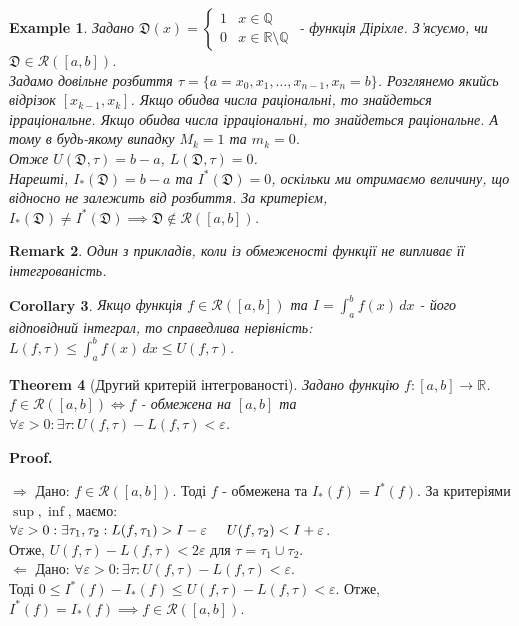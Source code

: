 \documentclass[a4paper, 10pt]{article}
\makeatletter
\def\huge{\displaystyle}
\def\qed{$\blacksquare$}
\def\rightproof{$\boxed{\Rightarrow}$ }
\def\leftproof{$\boxed{\Leftarrow}$ }
\theoremstyle{theoremdd}
\newtheorem{theorem}{Theorem}[subsection]
\theoremstyle{theoremdd}
\theoremstyle{theoremdd}
\theoremstyle{theoremdd}
\theoremstyle{theoremdd}
\newtheorem{example}[theorem]{Example}
\theoremstyle{theoremdd}
\theoremstyle{theoremdd}
\newtheorem{remark}[theorem]{Remark}
\theoremstyle{theoremdd}
\theoremstyle{theoremdd}
\newtheorem{corollary}[theorem]{Corollary}
\renewenvironment{proof}[1][Proof.\\]{\par
\pushQED{\hfill \qed}%
\normalfont \topsep6\p@\@plus6\p@\relax
\trivlist
\item\relax
{\bfseries
#1\@addpunct{.}}\hspace\labelsep\ignorespaces
}{%
\popQED\endtrivlist\@endpefalse
}
\makeatother
\begin{document}
\begin{example}
Задано $\mathfrak{D}(x) = \begin{cases} 1 & x \in \mathbb{Q} \\ 0 & x \in \mathbb{R} \setminus \mathbb{Q} \end{cases}$ - функція Діріхле. З'ясуємо, чи $\mathfrak{D} \in \mathcal{R}([a,b])$.\\
Задамо довільне розбиття $\tau = \{a = x_0,x_1,\dots,x_{n-1},x_n = b\}$. Розглянемо якийсь відрізок $[x_{k-1},x_k]$. Якщо обидва числа раціональні, то знайдеться ірраціональне. Якщо обидва числа ірраціональні, то знайдеться раціональне. А тому в будь-якому випадку $M_k =1$ та $m_k = 0$.\\
Отже $U(\mathfrak{D},\tau) = b-a$, \hspace{1cm} $L(\mathfrak{D},\tau) = 0$.\\
Нарешті, $I_*(\mathfrak{D}) = b-a$ та $I^*(\mathfrak{D}) = 0$, оскільки ми отримаємо величину, що відносно не залежить від розбиття. За критерієм, $I_*(\mathfrak{D}) \neq I^*(\mathfrak{D}) \implies \mathfrak{D} \not\in \mathcal{R}([a,b])$.
\end{example}

\begin{remark}
Один з прикладів, коли із обмеженості функції не випливає її інтегрованість.
\end{remark}

\begin{corollary}
Якщо функція $f \in \mathcal{R}([a,b])$ та $I = \huge\int_a^b f(x)\,dx$ - його відповідний інтеграл, то справедлива нерівність:\\
$L(f,\tau) \leq \huge\int_a^b f(x)\,dx \leq U(f, \tau)$.
\end{corollary}

\begin{theorem}[Другий критерій інтегрованості]
Задано функцію $f: [a,b] \to \mathbb{R}$.\\
$f \in \mathcal{R}([a,b]) \iff f$ - обмежена на $[a,b]$ та $\forall \varepsilon > 0: \exists \tau: U(f,\tau) - L(f,\tau) < \varepsilon$.
\end{theorem}

\begin{proof}
\rightproof Дано: $f \in \mathcal{R}([a,b])$. Тоді $f$ - обмежена та $I_*(f)=I^*(f)$. За критеріями $\sup,\inf$, маємо:\\
$\forall \varepsilon > 0: \exists \tau_1,\tau_2: L(f,\tau_1) > I - \varepsilon \hspace{0.5cm} U(f,\tau_2) < I + \varepsilon$.\\
Отже, $U(f,\tau) - L(f,\tau) < 2\varepsilon$ для $\tau = \tau_1 \cup \tau_2$.
\bigskip \\
\leftproof Дано: $\forall \varepsilon > 0: \exists \tau: U(f, \tau) - L(f,\tau) < \varepsilon$.\\
Тоді $0 \leq I^*(f) - I_*(f) \leq U(f, \tau) - L(f,\tau) < \varepsilon$. Отже, $I^*(f) = I_*(f) \implies f \in \mathcal{R}([a,b])$.
\end{proof}
\end{document}
